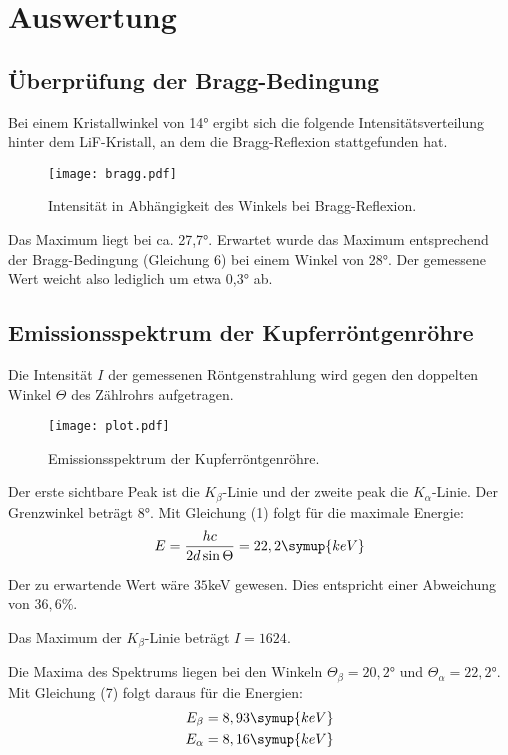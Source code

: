 \section{Auswertung}
\label{sec:Auswertung}

\subsection{Überprüfung der Bragg-Bedingung}

Bei einem Kristallwinkel von 14° ergibt sich die folgende Intensitätsverteilung
hinter dem LiF-Kristall, an dem die Bragg-Reflexion stattgefunden hat.

\begin{figure}
  \centering
  \texttt{[image: bragg.pdf]}
  \caption{Intensität in Abhängigkeit des Winkels bei Bragg-Reflexion.}
  \label{fig:bragg}
\end{figure}

Das Maximum liegt bei ca. 27,7°. Erwartet wurde das Maximum entsprechend der
Bragg-Bedingung (Gleichung 6) bei einem Winkel von 28°. Der gemessene Wert weicht
also lediglich um etwa 0,3° ab.


\subsection{Emissionsspektrum der Kupferröntgenröhre}

Die Intensität $I$ der gemessenen Röntgenstrahlung wird gegen den doppelten Winkel $\Theta$ des Zählrohrs aufgetragen.

\begin{figure}[H]
  \centering
  \texttt{[image: plot.pdf]}
  \caption{Emissionsspektrum der Kupferröntgenröhre.}
  \label{fig:plot}
\end{figure}

Der erste sichtbare Peak ist die $K_{\beta}$-Linie und der zweite peak die $K_{\alpha}$-Linie.
Der Grenzwinkel beträgt $8$°.
Mit Gleichung (1) folgt für die maximale Energie:
\begin{equation}
  E = \frac{hc}{2d \sin{\Theta}} = 22,2 \symup{keV}
\end{equation}

Der zu erwartende Wert wäre $35$keV gewesen.
Dies entspricht einer Abweichung von $36,6 \%$.

Das Maximum der $K_{\beta}$-Linie beträgt $I=1624$.

Die Maxima des Spektrums liegen bei den Winkeln $\Theta_{\beta} = 20,2°$ und $\Theta_{\alpha} = 22,2°$.
Mit Gleichung (7) folgt daraus für die Energien:
\begin{align*}
  E_{\beta} &= 8,93 \symup{keV} \\
  E_{\alpha} &= 8,16 \symup{keV}
\end{align*}


